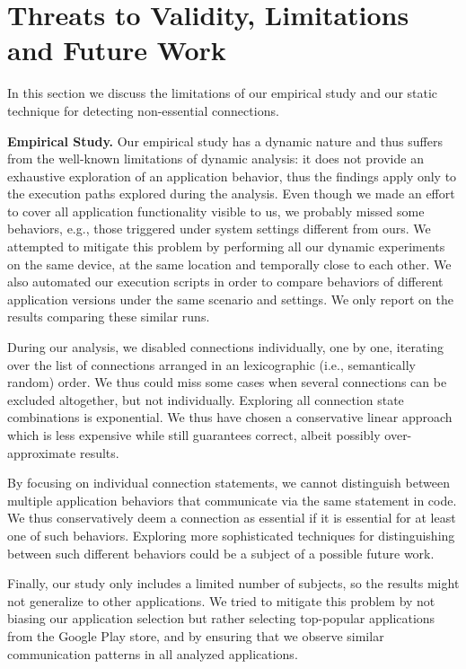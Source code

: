 \section{Threats to Validity, Limitations and Future Work}
\label{sec:limitations}
In this section we discuss the limitations of our empirical study and our static technique for detecting non-essential connections.

\vspace{0.1in}
\noindent 
{\bf Empirical Study.}
Our empirical study has a dynamic nature and thus suffers from the well-known limitations of dynamic analysis: it does not provide an exhaustive exploration of an application behavior, thus the findings apply only to the execution paths explored during the analysis. 
Even though we made an effort to cover all application functionality visible to us, we probably missed some behaviors, e.g., those triggered under system settings different from ours. 
We attempted to mitigate this problem by performing all our dynamic experiments on the same device, at the same location and temporally close to each other.  
We also automated our execution scripts in order to compare behaviors of different application versions under the same scenario and settings. 
We only report on the results comparing these similar runs.  

During our analysis, we disabled connections individually, one by one, iterating over the list of connections arranged in an lexicographic (i.e., semantically random) order. We thus could miss some cases when 
several connections can be excluded altogether, but not individually. 
Exploring all connection state combinations is exponential. 
We thus have chosen a conservative linear approach which is less expensive while still guarantees correct, 
albeit possibly over-approximate results. 

By focusing on individual connection statements, we cannot distinguish between multiple application behaviors
that communicate via the same statement in code. We thus conservatively deem a connection as essential if it is essential for at least one of such behaviors. Exploring more sophisticated techniques for distinguishing between such different behaviors could be a subject of a possible future work.
 
Finally, our study only includes a limited number of subjects, so the results might not generalize to other applications.
We tried to mitigate this problem by not biasing our application selection but rather selecting top-popular applications from the Google Play store, and by ensuring that we observe similar communication patterns in all analyzed applications.

